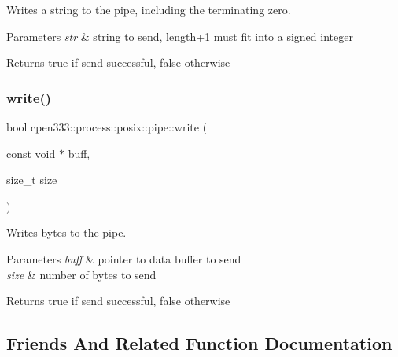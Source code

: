 Writes a string to the pipe, including the terminating zero. 


\begin{DoxyParams}{Parameters}
{\em str} & string to send, length+1 must fit into a signed integer \\
\hline
\end{DoxyParams}
\begin{DoxyReturn}{Returns}
true if send successful, false otherwise 
\end{DoxyReturn}
\mbox{\label{classcpen333_1_1process_1_1posix_1_1pipe_abb450a7e724dd5ad8fc364b2cc75c311}} 
\subsubsection{\texorpdfstring{write()}{write()}\hspace{0.1cm}{\footnotesize\ttfamily [2/2]}}
{\footnotesize\ttfamily bool cpen333\+::process\+::posix\+::pipe\+::write (\begin{DoxyParamCaption}\item[{const void $\ast$}]{buff,  }\item[{size\+\_\+t}]{size }\end{DoxyParamCaption})\hspace{0.3cm}{\ttfamily [inline]}}



Writes bytes to the pipe. 


\begin{DoxyParams}{Parameters}
{\em buff} & pointer to data buffer to send \\
\hline
{\em size} & number of bytes to send \\
\hline
\end{DoxyParams}
\begin{DoxyReturn}{Returns}
true if send successful, false otherwise 
\end{DoxyReturn}


\subsection{Friends And Related Function Documentation}
\mbox{\label{classcpen333_1_1process_1_1posix_1_1pipe_ab111e84ef31179e72c2bd2e58e2042b0}} 
